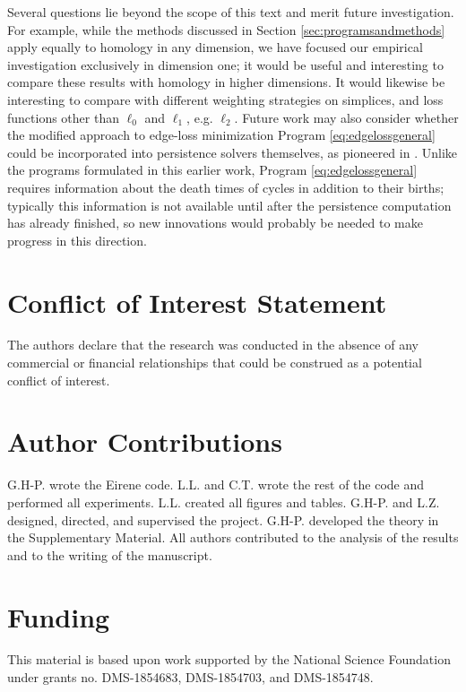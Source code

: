 \documentclass[11pt,onecolumn]{article}
\newcommand{\se}{Section }
\newcommand{\pr}{Program }
\theoremstyle{plain}
\theoremstyle{definition}
\begin{document}
\begin{enumerate}
 Several questions lie beyond the scope of this text and merit future investigation.  For example, while the methods discussed in \se \ref{sec:programsandmethods} apply equally to homology in any dimension, we have focused our empirical investigation exclusively in dimension one; it would be useful and interesting to compare these results with homology in higher dimensions.  It would likewise be interesting to compare with different weighting strategies on simplices, and loss functions other than $\ell_0$ and $\ell_1$, e.g. $\ell_2$.  Future work may also consider whether the modified approach to edge-loss minimization \pr \eqref{eq:edgelossgeneral} could be incorporated into persistence solvers themselves, as pioneered in \cite{Escolar2016}.  Unlike the programs formulated in this earlier work, \pr \eqref{eq:edgelossgeneral} requires information about the death times of cycles in addition to their births; typically this information is not available until after the persistence computation has already finished, so new innovations would probably be needed to make progress in this direction.   
    


\end{enumerate}

 





\section{Conflict of Interest Statement} 
The authors declare that the research was conducted in the absence of any commercial or financial relationships that could be construed as a potential conflict of interest.

\section{Author Contributions}

G.H-P. wrote the Eirene code. L.L. and C.T. wrote the rest of the code and performed all experiments. L.L. created all figures and tables. G.H-P. and L.Z. designed, directed, and supervised the project. G.H-P. developed the theory in the Supplementary Material. All authors contributed to the analysis of the results and to the writing of the manuscript.

\section{Funding}
This material is based upon work supported by the National Science Foundation under grants no. DMS-1854683, DMS-1854703, and DMS-1854748. 
\end{document}
